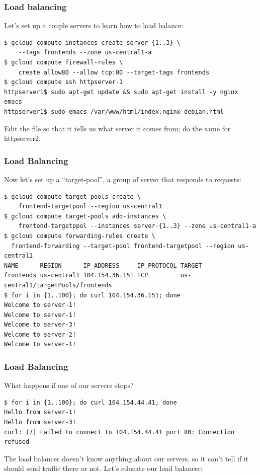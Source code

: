 \documentclass[9pt]{beamer}
\begin{document}
\begin{frame}[fragile]
  \frametitle{Load balancing}
  Let's set up a couple servers to learn how to load balance:
  \begin{verbatim}
$ gcloud compute instances create server-{1..3} \
    --tags frontends --zone us-central1-a
$ gcloud compute firewall-rules \
    create allow80 --allow tcp:80 --target-tags frontends
$ gcloud compute ssh httpserver-1
httpserver1$ sudo apt-get update && sudo apt-get install -y nginx emacs
httpserver1$ sudo emacs /var/www/html/index.nginx-debian.html 
  \end{verbatim}
Edit the file so that it tells us what server it comes from; do the same for httpserver2.
\end{frame}

\begin{frame}[fragile]
  \frametitle{Load Balancing}
  Now let's set up a ``target-pool'', a group of server that responds to requests:
\begin{verbatim}
$ gcloud compute target-pools create \
    frontend-targetpool --region us-central1
$ gcloud compute target-pools add-instances \ 
    frontend-targetppol --instances server-{1..3} --zone us-central1-a
$ gcloud compute forwarding-rules create \
  frontend-forwarding --target-pool frontend-targetpool --region us-central1
NAME      REGION      IP_ADDRESS     IP_PROTOCOL TARGET
frontends us-central1 104.154.36.151 TCP         us-central1/targetPools/frontends
$ for i in {1..100}; do curl 104.154.36.151; done
Welcome to server-1!
Welcome to server-1!
Welcome to server-3!
Welcome to server-2!
Welcome to server-1!
\end{verbatim}
\end{frame}

\begin{frame}[fragile]
  \frametitle{Load Balancing}
  What happens if one of our servers stops?
\begin{verbatim}
$ for i in {1..100}; do curl 104.154.44.41; done
Hello from server-1!
Hello from server-3!
curl: (7) Failed to connect to 104.154.44.41 port 80: Connection refused
\end{verbatim}
The load balancer doesn't know anything about our servers, so it can't tell if it should send traffic there or not. Let's educate our load balancer:
\end{frame}
\end{document}
